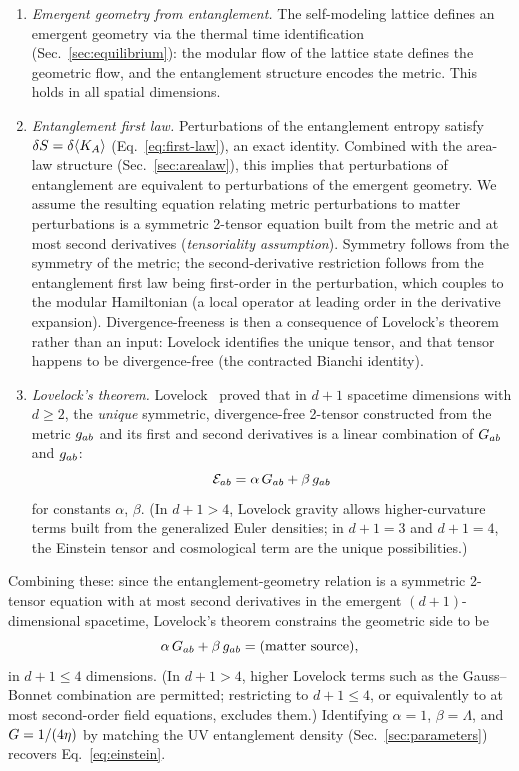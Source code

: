 \begin{enumerate}
\item \emph{Emergent geometry from entanglement.}  The self-modeling
  lattice defines an emergent geometry via the thermal time
  identification (Sec.~\ref{sec:equilibrium}): the modular flow of the
  lattice state defines the geometric flow, and the entanglement
  structure encodes the metric.  This holds in all spatial dimensions.
\item \emph{Entanglement first law.}  Perturbations of the entanglement
  entropy satisfy $\delta S = \delta\langle K_A\rangle$
  (Eq.~\ref{eq:first-law}), an exact identity.  Combined with the
  area-law structure (Sec.~\ref{sec:arealaw}), this implies that
  perturbations of entanglement are equivalent to perturbations of the
  emergent geometry.  We assume the resulting equation relating metric
  perturbations to matter perturbations is a symmetric 2-tensor equation
  built from the metric and at most second derivatives (\emph{tensoriality
  assumption}).  Symmetry follows from the symmetry of the metric;
  the second-derivative restriction follows from the entanglement first
  law being first-order in the perturbation, which couples to the
  modular Hamiltonian (a local operator at leading order in the
  derivative expansion).  Divergence-freeness is then a consequence
  of Lovelock's theorem rather than an input: Lovelock identifies the
  unique tensor, and that tensor happens to be divergence-free
  (the contracted Bianchi identity).
\item \emph{Lovelock's theorem.}  Lovelock~\cite{Lovelock1971,
  Lovelock1972} proved that in $d + 1$ spacetime dimensions with
  $d \geq 2$, the \emph{unique} symmetric, divergence-free 2-tensor
  constructed from the metric $g_{ab}$ and its first and second
  derivatives is a linear combination of $G_{ab}$ and $g_{ab}$:
  \begin{equation}
    \mathcal{E}_{ab} = \alpha\, G_{ab} + \beta\, g_{ab}
  \end{equation}
  for constants $\alpha$, $\beta$.  (In $d + 1 > 4$, Lovelock gravity
  allows higher-curvature terms built from the generalized
  Euler densities; in $d + 1 = 3$ and $d + 1 = 4$, the Einstein
  tensor and cosmological term are the unique possibilities.)
\end{enumerate}

Combining these: since the entanglement-geometry relation is a
symmetric 2-tensor equation with at most second derivatives in the
emergent $(d{+}1)$-dimensional spacetime, Lovelock's theorem constrains
the geometric side to be
\begin{equation}
  \alpha\, G_{ab} + \beta\, g_{ab} = \text{(matter source)},
  \label{eq:einstein-lovelock}
\end{equation}
in $d + 1 \leq 4$ dimensions.  (In $d + 1 > 4$, higher Lovelock terms
such as the Gauss--Bonnet combination are permitted; restricting to
$d + 1 \leq 4$, or equivalently to at most second-order field equations,
excludes them.)  Identifying $\alpha = 1$, $\beta = \Lambda$, and
$G = 1/(4\eta)$ by matching the UV entanglement density
(Sec.~\ref{sec:parameters}) recovers Eq.~\eqref{eq:einstein}.


